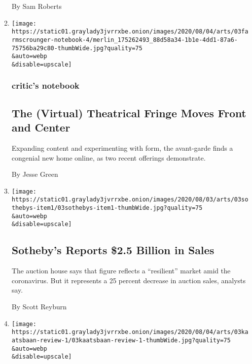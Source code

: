 \begin{enumerate}
  By Sam Roberts
\item
  \href{/2020/08/03/theater/virtual-theater.html}{}

  \texttt{[image: https://static01.graylady3jvrrxbe.onion/images/2020/08/04/arts/03farmscrounger-notebook-4/merlin\_175262493\_88d58a34-1b1e-4dd1-87a6-75756ba29c80-thumbWide.jpg?quality=75\\\&auto=webp\\\&disable=upscale]}

  \hypertarget{critics-notebook-1}{%
  \subsubsection{critic's notebook}\label{critics-notebook-1}}

  \hypertarget{the-virtual-theatrical-fringe-moves-front-and-center}{%
  \subsection{The (Virtual) Theatrical Fringe Moves Front and
  Center}\label{the-virtual-theatrical-fringe-moves-front-and-center}}

  Expanding content and experimenting with form, the avant-garde finds a
  congenial new home online, as two recent offerings demonstrate.

  By Jesse Green
\item
  \href{/2020/08/03/arts/design/sothebys-sales.html}{}

  \texttt{[image: https://static01.graylady3jvrrxbe.onion/images/2020/08/03/arts/03sothebys-item1/03sothebys-item1-thumbWide.jpg?quality=75\\\&auto=webp\\\&disable=upscale]}

  \hypertarget{sothebys-reports-25-billion-in-sales}{%
  \subsection{Sotheby's Reports \$2.5 Billion in
  Sales}\label{sothebys-reports-25-billion-in-sales}}

  The auction house says that figure reflects a ``resilient'' market
  amid the coronavirus. But it represents a 25 percent decrease in
  auction sales, analysts say.

  By Scott Reyburn
\item
  \href{/2020/08/03/arts/dance/kaatsbaan-dance.html}{}

  \texttt{[image: https://static01.graylady3jvrrxbe.onion/images/2020/08/04/arts/03kaatsbaan-review-1/03kaatsbaan-review-1-thumbWide.jpg?quality=75\\\&auto=webp\\\&disable=upscale]}


\end{enumerate}
